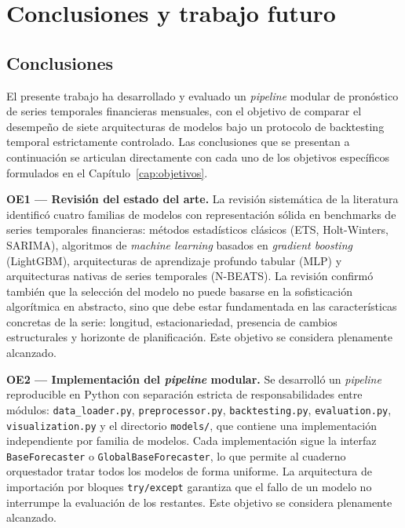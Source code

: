\chapter{Conclusiones y trabajo futuro}
\label{cap:conclusiones}

\section{Conclusiones}
\label{sec:conclusiones}

El presente trabajo ha desarrollado y evaluado un \textit{pipeline} modular de pronóstico de series temporales financieras mensuales, con el objetivo de comparar el desempeño de siete arquitecturas de modelos bajo un protocolo de backtesting temporal estrictamente controlado. Las conclusiones que se presentan a continuación se articulan directamente con cada uno de los objetivos específicos formulados en el Capítulo~\ref{cap:objetivos}.

\textbf{OE1 — Revisión del estado del arte.} La revisión sistemática de la literatura identificó cuatro familias de modelos con representación sólida en benchmarks de series temporales financieras: métodos estadísticos clásicos (ETS, Holt-Winters, SARIMA), algoritmos de \textit{machine learning} basados en \textit{gradient boosting} (LightGBM), arquitecturas de aprendizaje profundo tabular (MLP) y arquitecturas nativas de series temporales (N-BEATS). La revisión confirmó también que la selección del modelo no puede basarse en la sofisticación algorítmica en abstracto, sino que debe estar fundamentada en las características concretas de la serie: longitud, estacionariedad, presencia de cambios estructurales y horizonte de planificación. Este objetivo se considera plenamente alcanzado.

\textbf{OE2 — Implementación del \textit{pipeline} modular.} Se desarrolló un \textit{pipeline} reproducible en Python con separación estricta de responsabilidades entre módulos: \texttt{data\_loader.py}, \texttt{preprocessor.py}, \texttt{backtesting.py}, \texttt{evaluation.py}, \texttt{visualization.py} y el directorio \texttt{models/}, que contiene una implementación independiente por familia de modelos. Cada implementación sigue la interfaz \texttt{BaseForecaster} o \texttt{GlobalBaseForecaster}, lo que permite al cuaderno orquestador tratar todos los modelos de forma uniforme. La arquitectura de importación por bloques \texttt{try/except} garantiza que el fallo de un modelo no interrumpe la evaluación de los restantes. Este objetivo se considera plenamente alcanzado.

